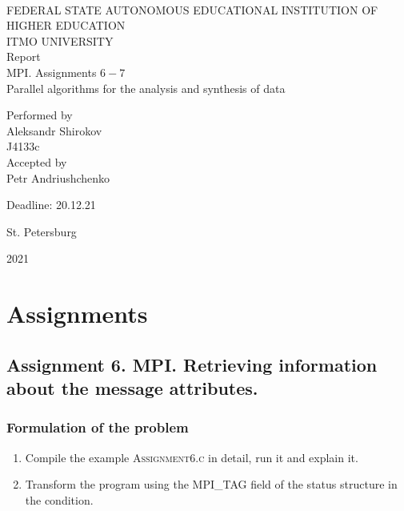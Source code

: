 \documentclass[%
12pt, %
final, %
oneside, %
onecolumn, %
centertags]{article} %
\theoremstyle{plain}
\theoremstyle{definition}
\theoremstyle{remark}
\begin{document}
	\begin{titlepage} 
		\begin{center}
		\textbf{}\\[2.0cm]
		\LARGE FEDERAL STATE AUTONOMOUS EDUCATIONAL INSTITUTION OF HIGHER EDUCATION \\[0.5cm]
		\Large ITMO UNIVERSITY \\[3cm]
		\LARGE Report\\
		\Large MPI. Assignments $6-7$ \\
		\Large Parallel algorithms for the analysis and synthesis of data \\[4cm]


		\begin{flushright}
		Performed by\\
		Aleksandr Shirokov\\
		J4133c\\
		Accepted by\\
		Petr Andriushchenko

		Deadline: 20.12.21
		\end{flushright}

		\vfill 

		{\Large {St. Petersburg}} \par
		{\Large {2021}}
		\end{center} 
	\end{titlepage}

\tableofcontents
\newpage


\section{Assignments}

\subsection{Assignment 6. MPI. Retrieving information about the message attributes.}

\subsubsection{Formulation of the problem}

\begin{enumerate}
	\item Compile the example \textsc{Assignment6.c} in detail, run it and explain it.
	\item Transform the program using the \textsc{MPI\_TAG} field of the status structure in the 
condition.
\end{enumerate}
\end{document}
